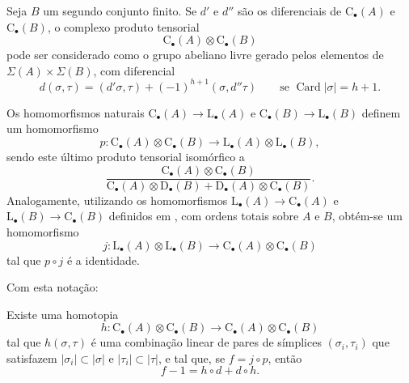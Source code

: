 \begin{env}[11.8.2]
\label{0.11.8.2}
Seja $B$ um segundo conjunto finito.
Se $d'$ e $d''$ são os diferenciais de
$\mathrm{C}_\bullet(A)$ e $\mathrm{C}_\bullet(B)$, o complexo produto
tensorial
\[
  \mathrm{C}_\bullet(A)\otimes\mathrm{C}_\bullet(B)
\]
pode ser considerado como o grupo abeliano livre gerado pelos elementos de
$\Sigma(A)\times\Sigma(B)$, com diferencial
\[
  d(\sigma,\tau)
  =
  (d'\sigma,\tau)+(-1)^{h+1}(\sigma,d''\tau)
  \qquad\text{se }\operatorname{Card}|\sigma|=h+1.
\]

Os homomorfismos naturais
$\mathrm{C}_\bullet(A)\to\mathrm{L}_\bullet(A)$ e
$\mathrm{C}_\bullet(B)\to\mathrm{L}_\bullet(B)$ definem um homomorfismo
\[
  p:
  \mathrm{C}_\bullet(A)\otimes\mathrm{C}_\bullet(B)
  \longrightarrow
  \mathrm{L}_\bullet(A)\otimes\mathrm{L}_\bullet(B),
\]
sendo este último produto tensorial isomórfico a
\[
  \frac{\mathrm{C}_\bullet(A)\otimes\mathrm{C}_\bullet(B)}
  {\mathrm{C}_\bullet(A)\otimes\mathrm{D}_\bullet(B)
   +\mathrm{D}_\bullet(A)\otimes\mathrm{C}_\bullet(B)}.
\]
Analogamente, utilizando os homomorfismos
$\mathrm{L}_\bullet(A)\to\mathrm{C}_\bullet(A)$ e
$\mathrm{L}_\bullet(B)\to\mathrm{C}_\bullet(B)$ definidos em
, com ordens totais sobre $A$ e $B$, obtém-se um
homomorfismo
\[
  j:
  \mathrm{L}_\bullet(A)\otimes\mathrm{L}_\bullet(B)
  \longrightarrow
  \mathrm{C}_\bullet(A)\otimes\mathrm{C}_\bullet(B)
\]
tal que $p\circ j$ é a identidade.
\end{env}

Com esta notação:
\begin{proposition}[11.8.3]
\label{0.11.8.3}
Existe uma homotopia
\[
  h:
  \mathrm{C}_\bullet(A)\otimes\mathrm{C}_\bullet(B)
  \longrightarrow
  \mathrm{C}_\bullet(A)\otimes\mathrm{C}_\bullet(B)
\]
tal que $h(\sigma,\tau)$ é uma combinação linear de pares de símplices
$(\sigma_i,\tau_i)$ que satisfazem
$|\sigma_i|\subset|\sigma|$ e $|\tau_i|\subset|\tau|$, e tal que,
se $f=j\circ p$, então
\[
  f-1=h\circ d+d\circ h.
  \tag{11.8.3.1}\label{0.11.8.3.1}
\]
\end{proposition}

